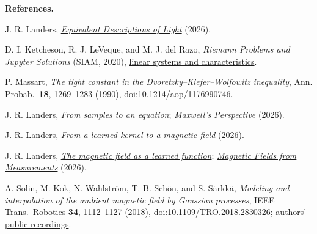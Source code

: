 \documentclass[11pt,letterpaper]{article}
\begin{document}
{\footnotesize\raggedright
\textbf{References.}\par
[1] J. R. Landers, \href{equivalent_descriptions.pdf}{\emph{Equivalent Descriptions of Light}} (2026).\par
[2] D. I. Ketcheson, R. J. LeVeque, and M. J. del Razo,
\emph{Riemann Problems and Jupyter Solutions} (SIAM, 2020),
\href{https://www.clawpack.org/riemann_book/html/Acoustics.html}{linear systems and characteristics}.\par
[3] P. Massart, \emph{The tight constant in the Dvoretzky--Kiefer--Wolfowitz inequality},
Ann. Probab.\ \textbf{18}, 1269--1283 (1990),
\href{https://doi.org/10.1214/aop/1176990746}{doi:10.1214/aop/1176990746}.\par
[4] J. R. Landers, \href{../01-kernel-to-equation/kernel_to_equation.pdf}{\emph{From samples to an equation}};
\href{../03-maxwells-perspective/maxwells_perspective.pdf}{\emph{Maxwell's Perspective}} (2026).\par
[5] J. R. Landers, \href{../02-kernel-to-magnetostatics/kernel_to_magnetostatics.pdf}{\emph{From a learned kernel to a magnetic field}} (2026).\par
[6] J. R. Landers, \href{../04-measurement-influence/measurement_influence.pdf}{\emph{The magnetic field as a learned function}};
\href{../arxiv-draft-maxwell/arxiv-draft.pdf}{\emph{Magnetic Fields from Measurements}} (2026).
\par
[7] A. Solin, M. Kok, N. Wahlstr\"om, T. B. Sch\"on, and S. S\"arkk\"a,
\emph{Modeling and interpolation of the ambient magnetic field by Gaussian processes},
IEEE Trans.\ Robotics \textbf{34}, 1112--1127 (2018),
\href{https://doi.org/10.1109/TRO.2018.2830326}{doi:10.1109/TRO.2018.2830326};
\href{https://github.com/AaltoML/magnetic-data}{authors' public recordings}.
}
\end{document}
